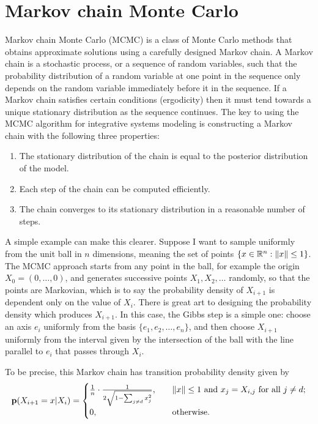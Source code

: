 \section{Markov chain Monte Carlo}
Markov chain Monte Carlo (MCMC) is a class of Monte Carlo methods that
obtains approximate solutions using a carefully designed Markov
chain. A Markov chain is a stochastic process, or a sequence of random
variables, such that the probability distribution of a random variable
at one point in the sequence only depends on the random variable
immediately before it in the sequence. If a Markov chain satisfies
certain conditions (ergodicity) then it must tend towards a unique stationary
distribution as the sequence continues. The key to using the MCMC
algorithm for integrative systems modeling is constructing a Markov
chain with the following three properties:
\begin{enumerate}
\item The stationary distribution of the chain is equal to the
  posterior distribution of the model.
\item Each step of the chain can be computed efficiently.
\item The chain converges to its stationary distribution in a
  reasonable number of steps.
\end{enumerate}

A simple example can make this clearer. Suppose I want to sample
uniformly from the unit ball in $n$ dimensions, meaning the set of
points $\{x \in \mathbb{R}^n: \|x\| \leq 1\}$.  The MCMC approach starts
from any point in the ball, for example the origin $X_0 = (0, \ldots,
0)$, and generates successive points $X_1, X_2, \ldots$ randomly, so
that the points are Markovian, which is to say the probability density
of $X_{i+1}$ is dependent only on the value of $X_i$.  There is great
art to designing the probability density which produces $X_{i+1}$.  In
this case, the Gibbs step is a simple one: choose an axis $e_i$
uniformly from the basis $\{e_1, e_2, \ldots, e_n\}$, and then choose
$X_{i+1}$ uniformly from the interval given by the
intersection of the ball with the line parallel to $e_i$ that passes through $X_i$.

To be precise, this Markov chain has transition probability density given by
\[
\mathbf{p}(X_{i+1}=x|X_i) = 
\begin{cases}
\frac{1}{n}\cdot\frac{1}{2\sqrt{1-\sum_{j \neq d} x_j^2}}, &\quad\|x\| \leq 1 \text{ and } x_j = X_{i,j} \text{ for all }j \neq d;\\
0, &\quad\text{otherwise.}
\end{cases}
\]

